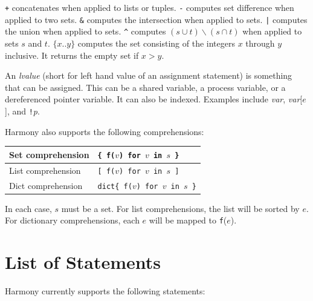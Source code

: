 \documentclass{report}
\begin{document}
\texttt{+} concatenates when applied to lists or tuples.
\texttt{-} computes set difference when applied to two sets.
\texttt{\&} computes the intersection when applied to sets.
\texttt{|} computes the union when applied to sets.
\texttt{\^} computes $(s \cup t) \backslash (s \cap t)$ when applied to sets $s$ and $t$.
\texttt{$\{ x .. y \}$} computes the set consisting of the integers $x$
through $y$ inclusive.  It returns the empty set if $x > y$.

An \emph{lvalue}
%
(short for left hand value of an assignment statement)
is something that can be assigned.  This can be a
shared variable, a process variable, or a dereferenced pointer
variable.  It can also be indexed.  Examples include
\textit{var}, \textit{var}[$e$], and \texttt{!{}}\textit{p}.

Harmony also supports the following comprehensions:

\vspace{1em}
\begin{tabular}{|l|l|}
\hline
Set comprehension & \texttt{\{ f($v$) for $v$ in $s$ \}} \\
\hline
List comprehension & \texttt{[ f($v$) for $v$ in $s$ ]} \\
\hline
Dict comprehension & \texttt{dict\{ f($v$) for $v$ in $s$ \}} \\
\hline
\end{tabular}
\vspace{1em}

In each case, $s$ must be a set.
For list comprehensions, the list will be sorted by $e$.
For dictionary comprehensions, each $e$ will be mapped to \texttt{f}($e$).

\chapter{List of Statements}

Harmony currently supports the following statements:
\end{document}
